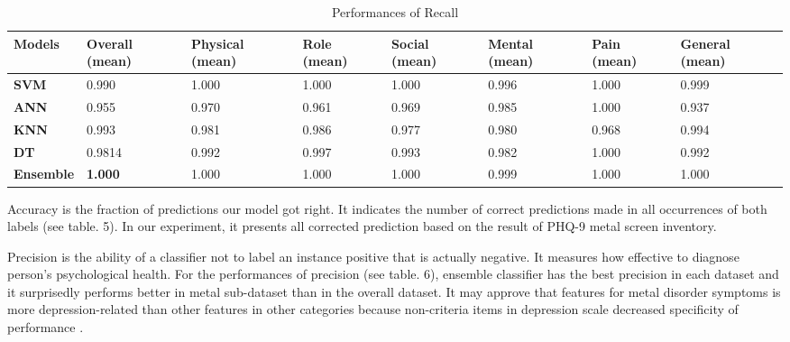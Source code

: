 \documentclass[10pt,journal,compsoc]{IEEEtran}
\begin{document}
\begin{table}[ht]
\begin{adjustwidth}{-1.5cm}{}
\begin{tabular}{|C{2cm}|C{1.5cm}|C{2cm}|C{1.5cm}|C{1.5cm}|C{1.5cm}|C{1.5cm}|C{2cm}|}
\hline
{} 
{\color[HTML]{333333} \textbf{Models}} & {\color[HTML]{333333} \textbf{Overall (mean)}} & {\color[HTML]{333333} \textbf{Physical (mean)}} & {\color[HTML]{333333} \textbf{Role (mean)}} &{\color[HTML]{333333} \textbf{Social (mean)}} & {\color[HTML]{333333} \textbf{Mental (mean)}} & {\color[HTML]{333333} \textbf{Pain (mean)}} & {\color[HTML]{333333} \textbf{General (mean)}} \\ \hline
{} 
\textbf{SVM} & 0.990 & 1.000  & 1.000  & 1.000  & 0.996   & 1.000   & 0.999    \\ \hline
{} 
\textbf{ANN}   & 0.955 & 0.970  & 0.961  & 0.969  & 0.985  & 1.000  & 0.937     \\ \hline
{} 
\textbf{KNN}  & 0.993 & 0.981  & 0.986  & 0.977 & 0.980 & 0.968  & 0.994      \\ \hline
{} 
\textbf{DT}  & 0.9814 & 0.992  & 0.997  & 0.993 & 0.982  & 1.000  & 0.992    \\ \hline
{} 
\textbf{Ensemble}   & \textbf{1.000} & 1.000 & 1.000  & 1.000  & 0.999  & 1.000 & 1.000   \\ \hline
\end{tabular}
\caption{Performances of Recall}
\label{Recall}
\end{adjustwidth}
\end{table}

Accuracy is the fraction of predictions our model got right. It indicates the number of correct predictions made in all occurrences of both labels (see table. 5). In our experiment, it presents all corrected prediction based on the result of PHQ-9 metal screen inventory.

Precision is the ability of a classifier not to label an instance positive that is actually negative. It measures how effective to diagnose person's psychological health. For the performances of precision (see table. 6), ensemble classifier has the best precision in each dataset and it surprisedly performs better in metal sub-dataset than in the overall dataset. It may approve that features for metal disorder symptoms is more depression-related than other features in other categories because non-criteria items in depression scale decreased specificity of performance \cite{Zimmerman}.
\end{document}
